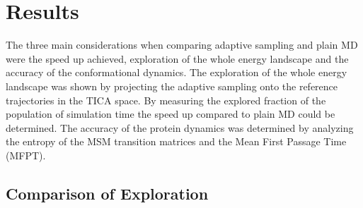 \begin{table}[H]

\centering
\caption{ExTASY parameters for MD and analysis, for both plain MD and adaptive sampling.  }\label{table:param1}
\end{table}


\section{\label{sec:results}Results}

The three main considerations when comparing adaptive sampling and plain MD were the speed up achieved, exploration of the whole energy landscape and the accuracy of the conformational dynamics.
The exploration of the whole energy landscape was shown by projecting the adaptive sampling onto the reference trajectories in the TICA space. By measuring the explored fraction of the population of simulation time the speed up compared to plain MD could be determined. The accuracy of the protein dynamics was determined by analyzing the entropy of the MSM transition
matrices and the Mean First Passage Time (MFPT).



\subsection{\label{sec:time-fold}Comparison of Exploration}

